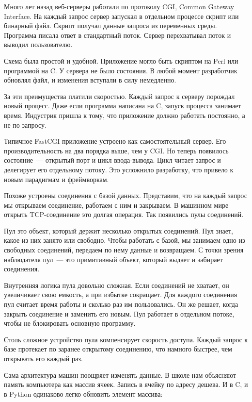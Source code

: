 Много лет назад веб-серверы работали по протоколу CGI, Common Gateway
Interface. На
каждый запрос сервер запускал в отдельном процессе скрипт или бинарный
файл. Скрипт получал данные запроса из переменных среды. Программа писала ответ
в стандартный поток. Сервер перехватывал поток и выводил пользователю.

Схема была простой и удобной. Приложение могло быть скриптом на Perl или
программой на C\Plus\Plus. У сервера не было состояния. В любой момент
разработчик обновлял файл, и изменения вступали в силу немедленно.

За эти преимущества платили скоростью. Каждый запрос к серверу порождал новый
процесс. Даже если программа написана на C, запуск процесса занимает
время. Индустрия пришла к тому, что приложение должно работать постоянно, а не
по запросу.

Типичное FastCGI-приложение устроено как самостоятельный сервер. Его
производительность на два порядка выше, чем у CGI. Но теперь появилось
состояние~--- открытый порт и цикл ввода-вывода. Цикл читает запрос и делегирует
его отдельному потоку. Это усложнило разработку, что привело к новым парадигмам
и фреймворкам.

Похоже устроены соединения с базой данных. Представим, что на каждый запрос мы
открываем соединение, работаем с ним и закрываем. В машинном мире открыть
TCP-соединение это долгая операция. Так появились пулы соединений.

Пул это объект, который держит несколько открытых соединений. Пул знает, какое
из них занято или свободно. Чтобы работать с базой, мы занимаем одно из
свободных соединений, передаем по нему данные и возвращаем. С точки зрения
наблюдателя пул~--- это примитивный объект, который выдает и забирает
соединения.

Внутренняя логика пула довольно сложная. Если соединений не хватает, он
увеличивает свою емкость, а при избытке сокращает. Для каждого соединения пул
считает время работы и сколько раз им пользовались. Он же решает, когда закрыть
соединение и заменить его новым. Пул работает в отдельном потоке, чтобы не
блокировать основную программу.

Столь сложное устройство пула компенсирует скорость доступа. Каждый запрос к
базе протекает по заранее открытому соединению, что намного быстрее, чем
открывать его каждый раз.

Сама архитектура машин поощряет изменять данные. В школе нам объясняют память
компьютера как массив ячеек. Запись в ячейку по адресу дешева. И в C\Plus\Plus,
и в Python одинаково легко обновить элемент массива:

